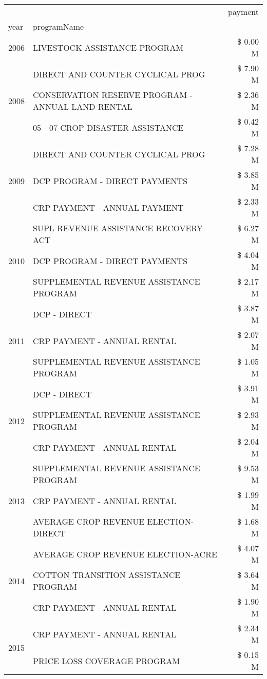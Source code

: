 \begin{tabular}{llr}
\toprule
 &  & payment \\
year & programName &  \\
\midrule
2006 & LIVESTOCK ASSISTANCE PROGRAM & \$ 0.00 M \\
\cline{1-3}
\multirow[t]{3}{*}{2008} & DIRECT AND COUNTER CYCLICAL PROG & \$ 7.90 M \\
 & CONSERVATION RESERVE PROGRAM - ANNUAL LAND RENTAL & \$ 2.36 M \\
 & 05 - 07 CROP DISASTER ASSISTANCE & \$ 0.42 M \\
\cline{1-3}
\multirow[t]{3}{*}{2009} & DIRECT AND COUNTER CYCLICAL PROG & \$ 7.28 M \\
 & DCP PROGRAM - DIRECT PAYMENTS & \$ 3.85 M \\
 & CRP PAYMENT - ANNUAL PAYMENT & \$ 2.33 M \\
\cline{1-3}
\multirow[t]{3}{*}{2010} & SUPL REVENUE ASSISTANCE RECOVERY ACT & \$ 6.27 M \\
 & DCP PROGRAM - DIRECT PAYMENTS & \$ 4.04 M \\
 & SUPPLEMENTAL REVENUE ASSISTANCE PROGRAM & \$ 2.17 M \\
\cline{1-3}
\multirow[t]{3}{*}{2011} & DCP - DIRECT & \$ 3.87 M \\
 & CRP PAYMENT - ANNUAL RENTAL & \$ 2.07 M \\
 & SUPPLEMENTAL REVENUE ASSISTANCE PROGRAM & \$ 1.05 M \\
\cline{1-3}
\multirow[t]{3}{*}{2012} & DCP - DIRECT & \$ 3.91 M \\
 & SUPPLEMENTAL REVENUE ASSISTANCE PROGRAM & \$ 2.93 M \\
 & CRP PAYMENT - ANNUAL RENTAL & \$ 2.04 M \\
\cline{1-3}
\multirow[t]{3}{*}{2013} & SUPPLEMENTAL REVENUE ASSISTANCE PROGRAM & \$ 9.53 M \\
 & CRP PAYMENT - ANNUAL RENTAL & \$ 1.99 M \\
 & AVERAGE CROP REVENUE ELECTION-DIRECT & \$ 1.68 M \\
\cline{1-3}
\multirow[t]{3}{*}{2014} & AVERAGE CROP REVENUE ELECTION-ACRE & \$ 4.07 M \\
 & COTTON TRANSITION ASSISTANCE PROGRAM & \$ 3.64 M \\
 & CRP PAYMENT - ANNUAL RENTAL & \$ 1.90 M \\
\cline{1-3}
\multirow[t]{3}{*}{2015} & CRP PAYMENT - ANNUAL RENTAL & \$ 2.34 M \\
 & PRICE LOSS COVERAGE PROGRAM & \$ 0.15 M \\

\end{tabular}
